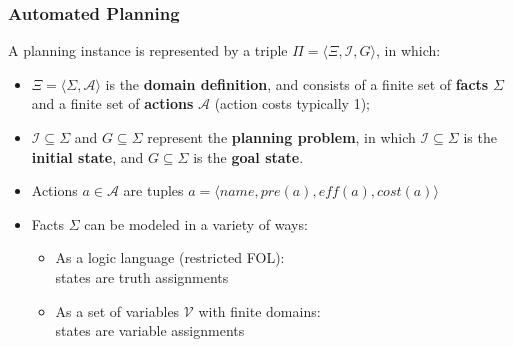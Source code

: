 \documentclass{beamer}
\newcommand{\todo}[1]{ {\color{red} #1} }
\begin{document}
	\begin{frame}[c]\frametitle{Automated Planning}
		\begin{definition} 
			A planning instance is represented by a triple $\Pi = \langle \Xi, \mathcal{I}, G\rangle$, in which:
			\begin{itemize}
				\item $\Xi = \langle \Sigma, \mathcal{A} \rangle$ is the \textbf{domain definition}, and consists of a finite set of \textbf{facts} $\Sigma$ and a finite set of \textbf{actions} $\mathcal{A}$ (action costs typically 1);
				\item $\mathcal{I} \subseteq \Sigma$ and $G \subseteq \Sigma$ represent the \textbf{planning problem}, in which $\mathcal{I} \subseteq \Sigma$ is the \textbf{initial state}, and $G \subseteq \Sigma$ is the \textbf{goal state}.
			\end{itemize}
		\end{definition}
		\begin{itemize}
			\item Actions $a \in \mathcal{A}$ are tuples $a = \langle \mathit{name}, \mathit{pre}(a), \mathit{eff}(a), \mathit{cost}(a) \rangle$
			\item Facts $\Sigma$ can be modeled in a variety of ways:
			\begin{itemize}
				\item As a logic language (restricted FOL): \\states are truth assignments
				\item As a set of variables $\mathcal{V}$ with finite domains: \\states are variable assignments
			\end{itemize}
		\end{itemize}
	\end{frame}

% 			
% 			
\end{document}

